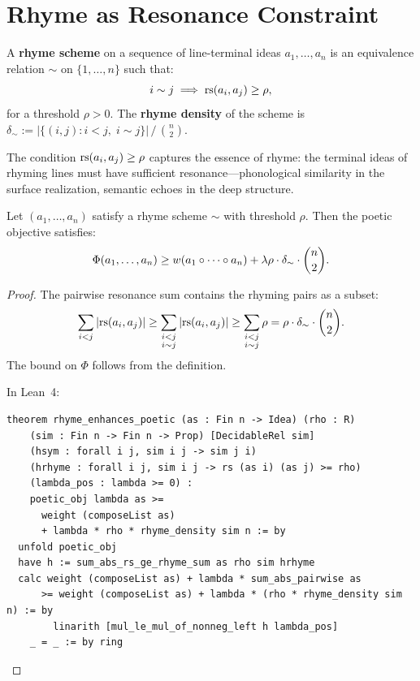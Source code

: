 \section{Rhyme as Resonance Constraint}

\begin{definition}
\label{def:rhyme-scheme}
A \textbf{rhyme scheme} on a sequence of line-terminal ideas
$a_1, \ldots, a_n$ is an equivalence relation $\sim$ on $\{1, \ldots, n\}$
such that:
\[
  i \sim j \;\Longrightarrow\;
  \mathrm{rs}(a_i, a_j) \geq \rho,
\]
for a threshold $\rho > 0$.  The \textbf{rhyme density} of the scheme is
$\delta_\sim := |\{(i,j) : i < j,\; i \sim j\}| \,/\, \binom{n}{2}$.
\end{definition}

The condition $\mathrm{rs}(a_i, a_j) \geq \rho$ captures the essence of rhyme: the
terminal ideas of rhyming lines must have sufficient resonance---phonological
similarity in the surface realization, semantic echoes in the deep structure.

\begin{theorem}
\label{thm:rhyme-poetic}
Let $(a_1, \ldots, a_n)$ satisfy a rhyme scheme $\sim$ with threshold $\rho$.
Then the poetic objective satisfies:
\[
  \Phi(a_1, \ldots, a_n) \geq
  w(a_1 \circ \cdots \circ a_n)
  + \lambda \rho \cdot \delta_\sim \cdot \binom{n}{2}.
\]
\end{theorem}

\begin{proof}
The pairwise resonance sum contains the rhyming pairs as a subset:
\[
  \sum_{i < j} |\mathrm{rs}(a_i, a_j)|
  \geq \sum_{\substack{i < j \\ i \sim j}} |\mathrm{rs}(a_i, a_j)|
  \geq \sum_{\substack{i < j \\ i \sim j}} \rho
  = \rho \cdot \delta_\sim \cdot \binom{n}{2}.
\]
The bound on $\Phi$ follows from the definition.

In Lean~4:
\begin{lstlisting}
theorem rhyme_enhances_poetic (as : Fin n -> Idea) (rho : R)
    (sim : Fin n -> Fin n -> Prop) [DecidableRel sim]
    (hsym : forall i j, sim i j -> sim j i)
    (hrhyme : forall i j, sim i j -> rs (as i) (as j) >= rho)
    (lambda_pos : lambda >= 0) :
    poetic_obj lambda as >=
      weight (composeList as)
      + lambda * rho * rhyme_density sim n := by
  unfold poetic_obj
  have h := sum_abs_rs_ge_rhyme_sum as rho sim hrhyme
  calc weight (composeList as) + lambda * sum_abs_pairwise as
      >= weight (composeList as) + lambda * (rho * rhyme_density sim n) := by
        linarith [mul_le_mul_of_nonneg_left h lambda_pos]
    _ = _ := by ring
\end{lstlisting}
\end{proof}

